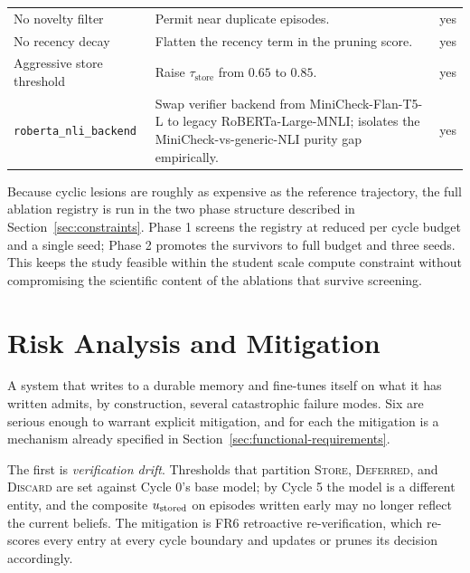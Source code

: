 \begin{table}[H]
\begin{tabular}{@{}p{4.6cm}p{7.8cm}c@{}}
No novelty filter                  & Permit near duplicate episodes.                                         & yes  \\
No recency decay                   & Flatten the recency term in the pruning score.                          & yes  \\
Aggressive store threshold         & Raise $\tau_{\text{store}}$ from $0.65$ to $0.85$.                      & yes  \\
\texttt{roberta\_nli\_backend}     & Swap verifier backend from MiniCheck-Flan-T5-L to legacy RoBERTa-Large-MNLI; isolates the MiniCheck-vs-generic-NLI purity gap empirically.  & yes  \\
\bottomrule
\end{tabular}
\end{table}

Because cyclic lesions are roughly as expensive as the reference trajectory, the full ablation registry is run in the two phase structure described in Section~\ref{sec:constraints}. Phase 1 screens the registry at reduced per cycle budget and a single seed; Phase 2 promotes the survivors to full budget and three seeds. This keeps the study feasible within the student scale compute constraint without compromising the scientific content of the ablations that survive screening.

\section{Risk Analysis and Mitigation}
\label{sec:risks}

A system that writes to a durable memory and fine-tunes itself on what it has written admits, by construction, several catastrophic failure modes. Six are serious enough to warrant explicit mitigation, and for each the mitigation is a mechanism already specified in Section~\ref{sec:functional-requirements}.

The first is \emph{verification drift}. Thresholds that partition \textsc{Store}, \textsc{Deferred}, and \textsc{Discard} are set against Cycle 0's base model; by Cycle 5 the model is a different entity, and the composite $u_{\text{stored}}$ on episodes written early may no longer reflect the current beliefs. The mitigation is FR6 retroactive re-verification, which re-scores every entry at every cycle boundary and updates or prunes its decision accordingly.

